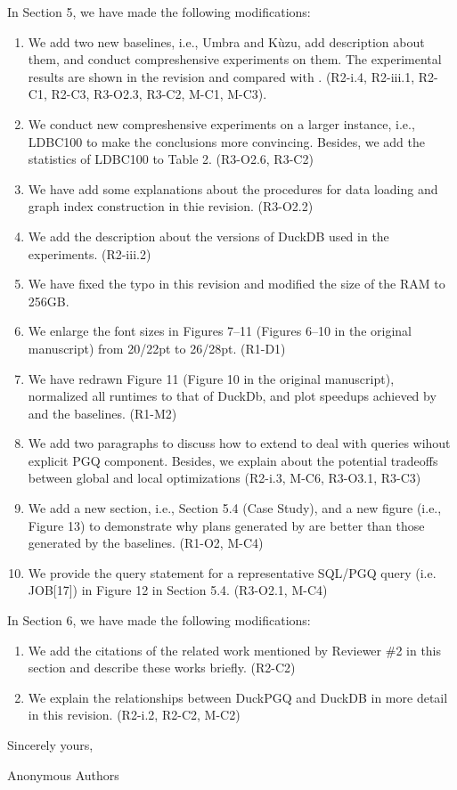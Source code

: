 \documentclass{article}
\begin{document}
In Section 5, we have made the following modifications:
\begin{enumerate}
	\item We add two new baselines, i.e., Umbra and Kùzu, add description about them, and conduct compreshensive experiments on them. The experimental results are shown in the revision and compared with \name. (R2-i.4, R2-iii.1, R2-C1, R2-C3, R3-O2.3, R3-C2, M-C1, M-C3).
	\item We conduct new compreshensive experiments on a larger instance, i.e., LDBC100 to make the conclusions more convincing. Besides, we add the statistics of LDBC100 to Table 2. (R3-O2.6, R3-C2)
	\item We have add some explanations about the procedures for data loading and graph index construction in thie revision. (R3-O2.2)
	\item We add the description about the versions of DuckDB used in the experiments. (R2-iii.2)
	\item We have fixed the typo in this revision and modified the size of the RAM to 256GB.
	\item We enlarge the font sizes in Figures 7--11 (Figures 6--10 in the original manuscript) from 20/22pt to 26/28pt. (R1-D1)
	\item We have redrawn Figure 11 (Figure 10 in the original manuscript), normalized all runtimes to that of DuckDb, and plot speedups achieved by \name and the baselines. (R1-M2)
	\item We add two paragraphs to discuss how to extend \name to deal with queries wihout explicit PGQ component. Besides, we explain about the potential tradeoffs between global and local optimizations (R2-i.3, M-C6, R3-O3.1, R3-C3)
	\item We add a new section, i.e., Section 5.4 (Case Study), and a new figure (i.e., Figure 13) to demonstrate why plans generated by \name are better than those generated by the baselines. (R1-O2, M-C4)
	\item We provide the query statement for a representative SQL/PGQ query (i.e. JOB[17]) in Figure 12 in Section 5.4. (R3-O2.1, M-C4)
\end{enumerate}

In Section 6, we have made the following modifications:
\begin{enumerate}
	\item We add the citations of the related work mentioned by Reviewer \#2 in this section and describe these works briefly. (R2-C2)
	\item We explain the relationships between DuckPGQ and DuckDB in more detail in this revision. (R2-i.2, R2-C2, M-C2)
\end{enumerate}



\bigskip %

Sincerely yours,

\vspace{20pt} %

Anonymous Authors
\end{document}
